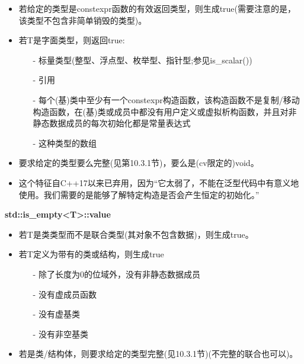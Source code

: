 \begin{itemize}
\item 
若给定的类型是constexpr函数的有效返回类型，则生成true(需要注意的是，该类型不包含非简单销毁的类型)。

\item 
若T是字面类型，则返回true:

\begin{itemize}
\item [-]
标量类型(整型、浮点型、枚举型、指针型;参见is\_scalar())

\item [-]
引用

\item [-]
每个(基)类中至少有一个constexpr构造函数，该构造函数不是复制/移动构造函数，在(基)类或成员中都没有用户定义或虚拟析构函数，并且对非静态数据成员的每次初始化都是常量表达式

\item [-]
这种类型的数组
\end{itemize}

\item 
要求给定的类型要么完整(见第10.3.1节)，要么是(cv限定的)void。

\item 
这个特征自C++17以来已弃用，因为“它太弱了，不能在泛型代码中有意义地使用。我们需要的是能够了解特定构造是否会产生恒定的初始化。”
\end{itemize}

\textbf{std::is\_empty<T>::value}

\begin{itemize}
\item 
若T是类类型而不是联合类型(其对象不包含数据)，则生成true。

\item 
若T定义为带有的类或结构，则生成true

\begin{itemize}
\item [-]
除了长度为0的位域外，没有非静态数据成员

\item [-]
没有虚成员函数

\item [-]
没有虚基类

\item [-]
没有非空基类
\end{itemize}

\item 
若是类/结构体，则要求给定的类型完整(见10.3.1节)(不完整的联合也可以)。
\end{itemize}


